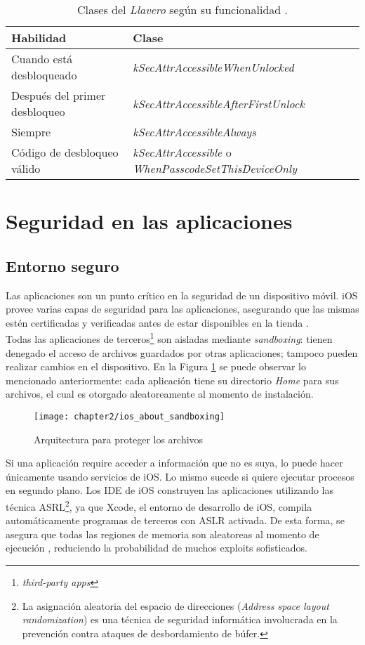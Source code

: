\begin{table}[hbtp]
    \centering
    \begin{tabular}{l l}
\textbf{Habilidad}    &    \textbf{Clase}   \\ \hline
Cuando est\'a desbloqueado    &   \textit{kSecAttrAccessibleWhenUnlocked} \\
Despu\'es del primer desbloqueo    &    \textit{kSecAttrAccessibleAfterFirstUnlock} \\
Siempre    &   \textit{kSecAttrAccessibleAlways}    \\
C\'odigo de desbloqueo v\'alido    &    \textit{kSecAttrAccessible} o \textit{WhenPasscodeSetThisDeviceOnly}
    \end{tabular}
    \caption{Clases del \textit{Llavero} seg\'un su funcionalidad \cite{asg}.}
    \label{tab:ch02:keychain-classes}
\end{table}
\section{Seguridad en las aplicaciones}
\subsection{Entorno seguro}
Las aplicaciones son un punto crítico en la seguridad de un dispositivo móvil. iOS provee varias capas de seguridad para las aplicaciones, asegurando que las mismas estén certificadas y verificadas antes de estar disponibles en la tienda \cite{asg}.\\
Todas las aplicaciones de terceros\footnote{\textit{third-party apps}} son aisladas mediante \textit{sandboxing}: tienen denegado el acceso de archivos guardados por otras aplicaciones; tampoco pueden realizar cambios en el dispositivo. En la Figura \ref{fig:ch02:sandboxing} se puede observar lo mencionado anteriormente: cada aplicaci\'on tiene su directorio \textit{Home} para sus archivos, el cual es otorgado aleatoreamente al momento de instalaci\'on.\\
\begin{figure}[hbtp]
	\centering
	\texttt{[image: chapter2/ios\_about\_sandboxing]}
    \caption{Arquitectura para proteger los archivos \cite{iosdl}} 
    \label{fig:ch02:sandboxing}
\end{figure}
Si una aplicaci\'on require acceder a información que no es suya, lo puede hacer únicamente usando servicios de iOS. Lo mismo sucede si quiere ejecutar procesos en segundo plano.
Los IDE de iOS construyen las aplicaciones utilizando las técnica ASRL\footnote{La asignación aleatoria del espacio de direcciones (\textit{Address space layout randomization}) es una técnica de seguridad informática involucrada en la prevención contra ataques de desbordamiento de búfer.}, ya que Xcode, el entorno de desarrollo de iOS, compila automáticamente programas de terceros con ASLR activada. De esta forma, se asegura que todas las regiones de memoria son aleatoreas al momento de ejecución \cite{asg}, reduciendo la probabilidad de muchos exploits sofisticados.

